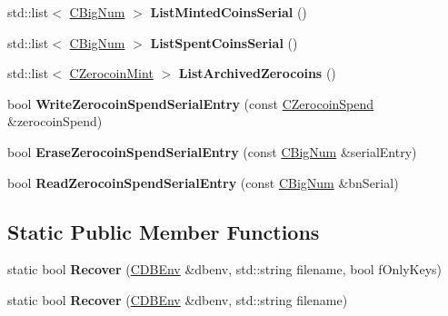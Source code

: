 \begin{DoxyCompactItemize}
\item 
\mbox{\label{class_c_wallet_d_b_af92fbfad1f351ddb2fd3d3991d58466f}} 
std\+::list$<$ \mbox{\hyperlink{class_c_big_num}{C\+Big\+Num}} $>$ {\bfseries List\+Minted\+Coins\+Serial} ()
\item 
\mbox{\label{class_c_wallet_d_b_af9f4cd1e9a193d0fbfef9f0864ee2eed}} 
std\+::list$<$ \mbox{\hyperlink{class_c_big_num}{C\+Big\+Num}} $>$ {\bfseries List\+Spent\+Coins\+Serial} ()
\item 
\mbox{\label{class_c_wallet_d_b_ab47fd5db0074ff3f1807ad4d9b448ec7}} 
std\+::list$<$ \mbox{\hyperlink{class_c_zerocoin_mint}{C\+Zerocoin\+Mint}} $>$ {\bfseries List\+Archived\+Zerocoins} ()
\item 
\mbox{\label{class_c_wallet_d_b_a5a7e57d473eecccc8ea6aaa49893159c}} 
bool {\bfseries Write\+Zerocoin\+Spend\+Serial\+Entry} (const \mbox{\hyperlink{class_c_zerocoin_spend}{C\+Zerocoin\+Spend}} \&zerocoin\+Spend)
\item 
\mbox{\label{class_c_wallet_d_b_afc8ef7cd02d72b779ff1cfc08637f748}} 
bool {\bfseries Erase\+Zerocoin\+Spend\+Serial\+Entry} (const \mbox{\hyperlink{class_c_big_num}{C\+Big\+Num}} \&serial\+Entry)
\item 
\mbox{\label{class_c_wallet_d_b_a8913787be5585ea2039920ade85a1850}} 
bool {\bfseries Read\+Zerocoin\+Spend\+Serial\+Entry} (const \mbox{\hyperlink{class_c_big_num}{C\+Big\+Num}} \&bn\+Serial)
\end{DoxyCompactItemize}
\subsection*{Static Public Member Functions}
\begin{DoxyCompactItemize}
\item 
\mbox{\label{class_c_wallet_d_b_a3ebeb12f37d9c66512e2bc2903a6854a}} 
static bool {\bfseries Recover} (\mbox{\hyperlink{class_c_d_b_env}{C\+D\+B\+Env}} \&dbenv, std\+::string filename, bool f\+Only\+Keys)
\item 
\mbox{\label{class_c_wallet_d_b_a44388f1c3ee63191dcb78b1001e9390c}} 
static bool {\bfseries Recover} (\mbox{\hyperlink{class_c_d_b_env}{C\+D\+B\+Env}} \&dbenv, std\+::string filename)
\end{DoxyCompactItemize}

